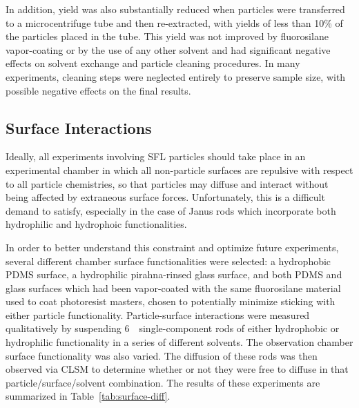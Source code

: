 In addition, yield was also substantially reduced when particles were transferred to a microcentrifuge tube
and then re-extracted, with yields of less than 10\% of the particles placed in the tube.  This yield was
not improved by fluorosilane vapor-coating or by the use of any other solvent and had significant
negative effects on solvent exchange and particle cleaning procedures.  In many experiments, cleaning 
steps were neglected entirely to preserve sample size, with possible negative effects on the final results.

\subsection{Surface Interactions}
\label{sec:surface-interact}

Ideally, all experiments involving SFL particles should take place in an experimental
chamber in which all non-particle surfaces are repulsive with respect to all
particle chemistries, so that particles may diffuse and interact without 
being affected by extraneous surface forces.  Unfortunately, this is a difficult demand to 
satisfy, especially in the case of Janus rods which incorporate both hydrophilic and 
hydrophoic functionalities. 

In order to better understand this constraint and optimize future experiments, several different 
chamber surface
functionalities were selected: a hydrophobic PDMS surface, a hydrophilic pirahna-rinsed glass surface,
and both PDMS and glass surfaces which had been vapor-coated with the same fluorosilane material used
to coat photoresist masters, chosen to potentially minimize sticking with either particle functionality.
Particle-surface interactions were measured qualitatively by suspending 6~\microns~single-component rods
of either hydrophobic or hydrophilic functionality in a series of different solvents.
The observation chamber surface functionality was also varied.
The diffusion of these rods was then observed via CLSM to 
determine whether or not they were free to diffuse in that particle/surface/solvent combination.
The results of these experiments are summarized in Table~\ref{tab:surface-diff}.

